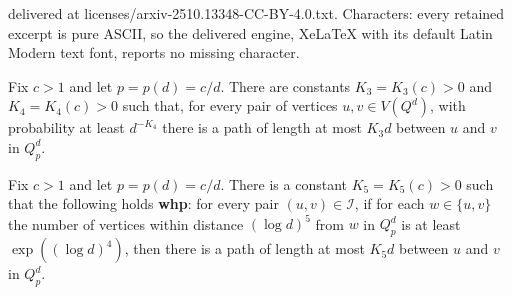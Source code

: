 \documentclass[10pt,a4paper]{amsart}
\newcommand{\cI}{\mathcal{I}}
\begin{document}
delivered at licenses/arxiv-2510.13348-CC-BY-4.0.txt. Characters: every retained excerpt is pure ASCII, so the delivered engine, XeLaTeX with its default Latin Modern text font, reports no missing character.
\begin{lemma}\label{lem:bootstrap_7.1}
Fix $c>1$ and let $p=p(d)=c/d$. There are constants $K_3=K_3(c)>0$ and $K_4=K_4(c)>0$ such that, for every pair of vertices $u,v\in V(Q^d)$, with probability at least $d^{-K_4}$ there is a path of length at most $K_3d$ between $u$ and $v$ in $Q^d_p$. 
\end{lemma}

\begin{lemma}\label{lem:diameter_for a pair}
Fix $c>1$ and let $p=p(d)=c/d$. There is a constant $K_5=K_5(c)>0$ such that the following holds \textbf{whp}: for every pair $(u,v)\in \cI$, if for each $w\in \{u,v\}$ the number of vertices within distance $(\log d)^5$ from $w$ in $Q_p^d$ is at least $\exp((\log d)^4)$, then there is a path of length at most $K_5d$ between $u$ and $v$ in $Q^d_p$.
\end{lemma}
\end{document}
